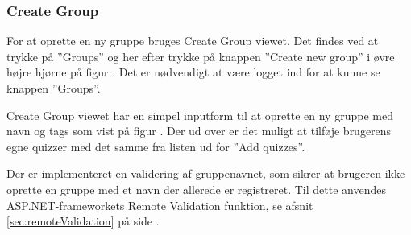 \subsubsection{Create Group}
For at oprette en ny gruppe bruges Create Group viewet. Det findes ved at trykke på ''Groups'' og her efter trykke på knappen ''Create new group'' i øvre højre hjørne på figur . Det er nødvendigt at være logget ind for at kunne se knappen ''Groups''.

Create Group viewet har en simpel inputform til at oprette en ny gruppe med navn og tags som vist på figur . Der ud over er det muligt at tilføje brugerens egne quizzer med det samme fra listen ud for ''Add quizzes''.

Der er implementeret en validering af gruppenavnet, som sikrer at brugeren ikke oprette en gruppe med et navn der allerede er registreret. Til dette anvendes ASP.NET-frameworkets Remote Validation funktion, se afsnit \ref{sec:remoteValidation} på side \pageref{sec:remoteValidation}.

